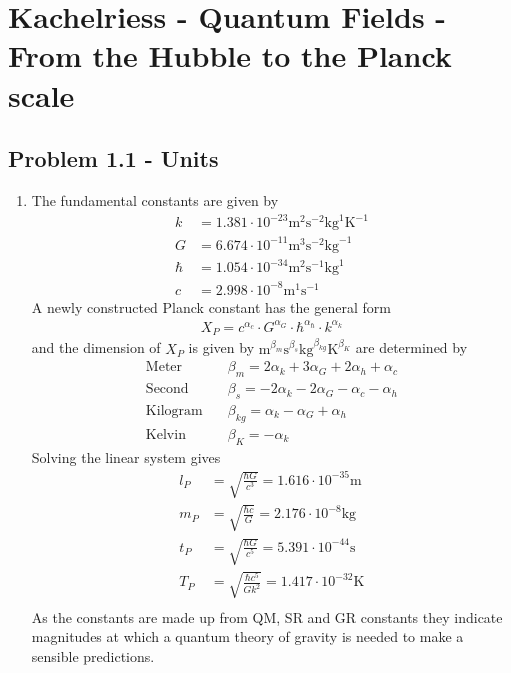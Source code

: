 \documentclass[10pt,a4paper]{book}
\theoremstyle{definition}
\begin{document}
\section{{\sc Kachelriess} - Quantum Fields - From the Hubble to the Planck scale}
\subsection{Problem 1.1 - Units}
\begin{enumerate}
\item The fundamental constants are given by
\begin{align}
    k    &=1.381\cdot10^{-23} \text{m}^2\text{s}^{-2}\text{kg}^{ 1}\text{K}^{-1}\\
    G    &=6.674\cdot10^{-11} \text{m}^3\text{s}^{-2}\text{kg}^{-1}\\
    \hbar&=1.054\cdot10^{-34} \text{m}^2\text{s}^{-1}\text{kg}^{ 1}\\
    c    &=2.998\cdot10^{-8}  \text{m}^1\text{s}^{-1}
\end{align}
A newly constructed Planck constant has the general form
\begin{align}
    X_P=c^{\alpha_c}\cdot G^{\alpha_G}\cdot \hbar^{\alpha_\hbar}\cdot k^{\alpha_k}
\end{align}
and the dimension of $X_P$ is given by $\text{m}^{\beta_m}\text{s}^{\beta_s}\text{kg}^{\beta_{kg}}\text{K}^{\beta_K}$ are determined by
\begin{align}
    \text{Meter}\quad    &\beta_m=2\alpha_k+3\alpha_G+2\alpha_h+\alpha_c\\
    \text{Second}\quad   &\beta_s=-2\alpha_k-2\alpha_G-\alpha_c-\alpha_h\\
    \text{Kilogram}\quad &\beta_{kg}=\alpha_k-\alpha_G+\alpha_h\\
    \text{Kelvin}\quad   &\beta_K=-\alpha_k
\end{align}
Solving the linear system gives
\begin{align}
    l_P&=\sqrt{\frac{\hbar G}{c^3}}=1.616\cdot 10^{-35}\text{m}\\
    m_P&=\sqrt{\frac{\hbar c}{G}}=2.176\cdot 10^{-8}\text{kg}\\
    t_P&=\sqrt{\frac{\hbar G}{c^5}}=5.391\cdot 10^{-44}\text{s}\\
    T_P&=\sqrt{\frac{\hbar c^5}{Gk^2}}=1.417\cdot 10^{-32}\text{K}\\
\end{align}
As the constants are made up from QM, SR and GR constants they indicate magnitudes at which a quantum theory of gravity is needed to make a sensible predictions.


\end{enumerate}
\end{document}
